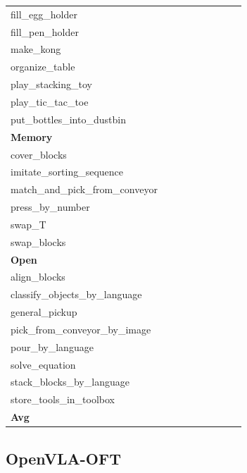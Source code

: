 \begin{table}[H]
{\begin{tabular}{l|c|c|c|c|c|c|c|c}
fill\_egg\_holder &  &  &  &  &  &  &  &  \\
fill\_pen\_holder &  &  &  &  &  &  &  &  \\
make\_kong &  &  &  &  &  &  &  &  \\
organize\_table &  &  &  &  &  &  &  &  \\
play\_stacking\_toy &  &  &  &  &  &  &  &  \\
play\_tic\_tac\_toe &  &  &  &  &  &  &  &  \\
put\_bottles\_into\_dustbin &  &  &  &  &  &  &  &  \\
\hline
\multicolumn{9}{l}{\textbf{Memory}} \\
cover\_blocks &  &  &  &  &  &  &  &  \\
imitate\_sorting\_sequence &  &  &  &  &  &  &  &  \\
match\_and\_pick\_from\_conveyor &  &  &  &  &  &  &  &  \\
press\_by\_number &  &  &  &  &  &  &  &  \\
swap\_T &  &  &  &  &  &  &  &  \\
swap\_blocks &  &  &  &  &  &  &  &  \\
\hline
\multicolumn{9}{l}{\textbf{Open}} \\
align\_blocks &  &  &  &  &  &  &  &  \\
classify\_objects\_by\_language &  &  &  &  &  &  &  &  \\
general\_pickup &  &  &  &  &  &  &  &  \\
pick\_from\_conveyor\_by\_image &  &  &  &  &  &  &  &  \\
pour\_by\_language &  &  &  &  &  &  &  &  \\
solve\_equation &  &  &  &  &  &  &  &  \\
stack\_blocks\_by\_language &  &  &  &  &  &  &  &  \\
store\_tools\_in\_toolbox &  &  &  &  &  &  &  &  \\
\hline
\textbf{Avg} &  &  &  &  &  &  &  &  \\
\hline
\end{tabular}
}
\end{table}
\subsection{OpenVLA-OFT}
\label{part:openvla_oft}

